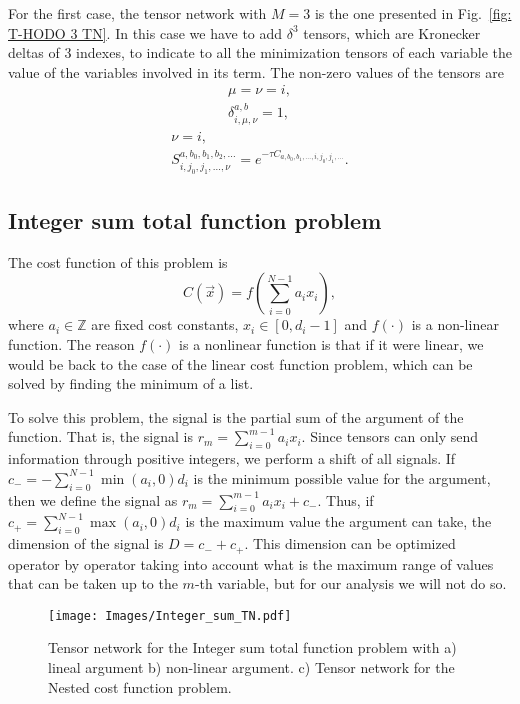 For the first case, the tensor network with $M=3$ is the one presented in Fig.~\ref{fig: T-HODO 3 TN}. In this case we have to add $\delta^3$ tensors, which are Kronecker deltas of 3 indexes, to indicate to all the minimization tensors of each variable the value of the variables involved in its term. The non-zero values of the tensors are
\begin{equation}
    \begin{gathered}
        \mu = \nu = i,\\
        \delta^{a,b}_{i,\mu,\nu} = 1,
    \end{gathered}
\end{equation}
\begin{equation}
    \begin{gathered}
        \nu = i,\\
        S^{a,b_0,b_1,b_2,\dots}_{i,j_0,j_1,\dots,\nu} = e^{-\tau C_{a,b_0,b_1,\dots,i,j_0,j_1,\dots}}.
    \end{gathered}
\end{equation}

\subsection{Integer sum total function problem}
The cost function of this problem is
\begin{equation}
    C(\vec{x})=f\left(\sum_{i=0}^{N-1} a_i x_i\right),
\end{equation}
where $a_i\in \mathbb{Z}$ are fixed cost constants, $x_i\in [0,d_i-1]$ and $f(\cdot)$ is a non-linear function. The reason $f(\cdot)$ is a nonlinear function is that if it were linear, we would be back to the case of the linear cost function problem, which can be solved by finding the minimum of a list.

To solve this problem, the signal is the partial sum of the argument of the function. That is, the signal is $r_m=\sum_{i=0}^{m-1} a_i x_i$. Since tensors can only send information through positive integers, we perform a shift of all signals. If $c_-=-\sum_{i=0}^{N-1} \min(a_i,0) d_i$ is the minimum possible value for the argument, then we define the signal as $r_m=\sum_{i=0}^{m-1} a_i x_i + c_-$. Thus, if $c_+=\sum_{i=0}^{N-1} \max(a_i,0) d_i$ is the maximum value the argument can take, the dimension of the signal is $D=c_-+c_+$. This dimension can be optimized operator by operator taking into account what is the maximum range of values that can be taken up to the $m$-th variable, but for our analysis we will not do so.
\begin{figure}
    \centering
    \texttt{[image: Images/Integer\_sum\_TN.pdf]}
    \caption{Tensor network for the Integer sum total function problem with a) lineal argument b) non-linear argument. c) Tensor network for the Nested cost function problem.}
    \label{fig: Integer Sum TN}
\end{figure}

